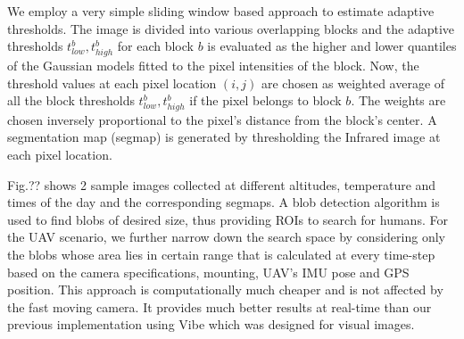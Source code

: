 \documentclass[runningheads]{llncs}
\begin{document}
We employ a very simple sliding window based approach to estimate adaptive thresholds. The image is divided into various overlapping blocks and the adaptive thresholds $t_{low}^b, t_{high}^b$ for each block $b$ is evaluated as the higher and lower quantiles of the Gaussian models fitted to the pixel intensities of the block. Now, the threshold values at each pixel location $(i, j)$ are chosen as weighted average of all the block thresholds $t_{low}^b, t_{high}^b$ if the pixel belongs to block $b$. The weights are chosen inversely proportional to the pixel's distance from the block's center. A segmentation map (segmap) is generated by thresholding the Infrared image at each pixel location.

Fig.?? shows 2 sample images collected at different altitudes, temperature and times of the day and the corresponding segmaps. A blob detection algorithm \cite{cvblob} is used to find blobs of desired size, thus providing ROIs to search for humans. For the UAV scenario, we further narrow down the search space by considering only the blobs whose area lies in certain range that is calculated at every time-step based on the camera specifications, mounting, UAV's IMU pose and GPS position. This approach is computationally much cheaper and is not affected by the fast moving camera. It provides much better results at real-time than our previous implementation using Vibe \cite{barnich2011vibe} which was designed for visual images.
\end{document}
